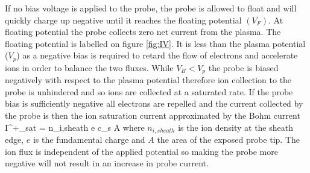 If no bias voltage is applied to the probe, the probe is allowed to float and will quickly charge up negative until it reaches the floating potential $(V_F)$. At floating potential the probe collects zero net current from the plasma. The floating potential is labelled on figure \ref{fig:IV}. It is less than the plasma potential ($V_{p}$) as a negative bias is required to retard the flow of electrons and accelerate ions in order to balance the two fluxes.  While $V_B < V_{p}$ the probe is biased negatively with respect to the plasma potential therefore ion collection to the probe is unhindered and so ions are collected at a saturated rate. If the probe bias is sufficiently negative all electrons are repelled and the current collected by the probe is then the ion saturation current approximated by the Bohm current 
\be 
I^{+}_{sat} = n_{i,sheath} e c_s A 
\label{eq:isat}
\ee
where $n_{i,sheath}$ is the ion density at the sheath edge, $e$ is the fundamental charge and $A$ the area of the exposed probe tip.
The ion flux is independent of the applied potential so making the probe more negative will not result in an increase in probe current. %

